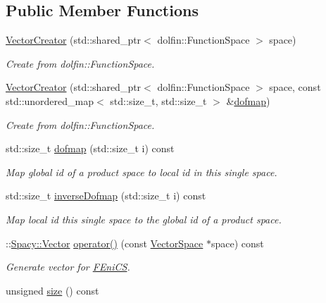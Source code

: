 \subsection*{Public Member Functions}
\begin{DoxyCompactItemize}
\item 
\hyperlink{classSpacy_1_1FEniCS_1_1VectorCreator_aadf9d699ede2e83816411523175248d8}{Vector\+Creator} (std\+::shared\+\_\+ptr$<$ dolfin\+::\+Function\+Space $>$ space)
\begin{DoxyCompactList}\small\item\em Create from dolfin\+::\+Function\+Space. \end{DoxyCompactList}\item 
\hyperlink{classSpacy_1_1FEniCS_1_1VectorCreator_a642f907081ec0796b871a5e290b9679d}{Vector\+Creator} (std\+::shared\+\_\+ptr$<$ dolfin\+::\+Function\+Space $>$ space, const std\+::unordered\+\_\+map$<$ std\+::size\+\_\+t, std\+::size\+\_\+t $>$ \&\hyperlink{classSpacy_1_1FEniCS_1_1VectorCreator_ad41a34e44494e8d166f9890a8877f994}{dofmap})
\begin{DoxyCompactList}\small\item\em Create from dolfin\+::\+Function\+Space. \end{DoxyCompactList}\item 
std\+::size\+\_\+t \hyperlink{classSpacy_1_1FEniCS_1_1VectorCreator_ad41a34e44494e8d166f9890a8877f994}{dofmap} (std\+::size\+\_\+t i) const 
\begin{DoxyCompactList}\small\item\em Map global id of a product space to local id in this single space. \end{DoxyCompactList}\item 
std\+::size\+\_\+t \hyperlink{classSpacy_1_1FEniCS_1_1VectorCreator_a8e369dcbb722462ee0bca008eae6b2f3}{inverse\+Dofmap} (std\+::size\+\_\+t i) const 
\begin{DoxyCompactList}\small\item\em Map local id this single space to the global id of a product space. \end{DoxyCompactList}\item 
\+::\hyperlink{classSpacy_1_1Vector}{Spacy\+::\+Vector} \hyperlink{classSpacy_1_1FEniCS_1_1VectorCreator_ab5121de05ec984b99febef9e839068dc}{operator()} (const \hyperlink{classSpacy_1_1VectorSpace}{Vector\+Space} $\ast$space) const 
\begin{DoxyCompactList}\small\item\em Generate vector for \hyperlink{namespaceSpacy_1_1FEniCS}{F\+Eni\+CS}. \end{DoxyCompactList}\item 
unsigned \hyperlink{classSpacy_1_1FEniCS_1_1VectorCreator_afb8357f953730e792e18e8bc16a585b4}{size} () const \hypertarget{classSpacy_1_1FEniCS_1_1VectorCreator_afb8357f953730e792e18e8bc16a585b4}{}\label{classSpacy_1_1FEniCS_1_1VectorCreator_afb8357f953730e792e18e8bc16a585b4}


\end{DoxyCompactItemize}
